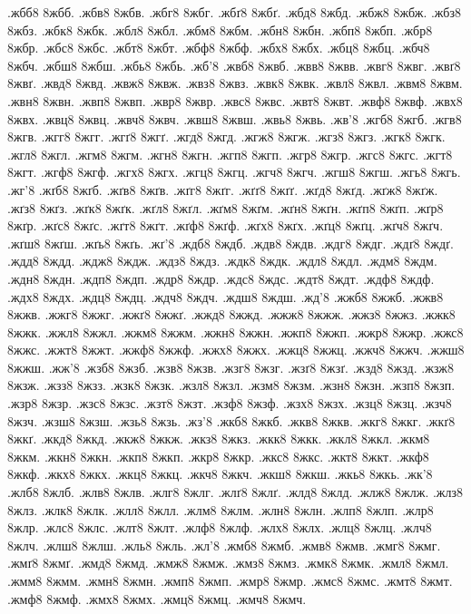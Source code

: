 {%
.жбб8 8жбб.
.жбв8 8жбв.
.жбг8 8жбг.
.жбґ8 8жбґ.
.жбд8 8жбд.
.жбж8 8жбж.
.жбз8 8жбз.
.жбк8 8жбк.
.жбл8 8жбл.
.жбм8 8жбм.
.жбн8 8жбн.
.жбп8 8жбп.
.жбр8 8жбр.
.жбс8 8жбс.
.жбт8 8жбт.
.жбф8 8жбф.
.жбх8 8жбх.
.жбц8 8жбц.
.жбч8 8жбч.
.жбш8 8жбш.
.жбь8 8жбь.
.жб'8
.жвб8 8жвб.
.жвв8 8жвв.
.жвг8 8жвг.
.жвґ8 8жвґ.
.жвд8 8жвд.
.жвж8 8жвж.
.жвз8 8жвз.
.жвк8 8жвк.
.жвл8 8жвл.
.жвм8 8жвм.
.жвн8 8жвн.
.жвп8 8жвп.
.жвр8 8жвр.
.жвс8 8жвс.
.жвт8 8жвт.
.жвф8 8жвф.
.жвх8 8жвх.
.жвц8 8жвц.
.жвч8 8жвч.
.жвш8 8жвш.
.жвь8 8жвь.
.жв'8
.жгб8 8жгб.
.жгв8 8жгв.
.жгг8 8жгг.
.жгґ8 8жгґ.
.жгд8 8жгд.
.жгж8 8жгж.
.жгз8 8жгз.
.жгк8 8жгк.
.жгл8 8жгл.
.жгм8 8жгм.
.жгн8 8жгн.
.жгп8 8жгп.
.жгр8 8жгр.
.жгс8 8жгс.
.жгт8 8жгт.
.жгф8 8жгф.
.жгх8 8жгх.
.жгц8 8жгц.
.жгч8 8жгч.
.жгш8 8жгш.
.жгь8 8жгь.
.жг'8
.жґб8 8жґб.
.жґв8 8жґв.
.жґг8 8жґг.
.жґґ8 8жґґ.
.жґд8 8жґд.
.жґж8 8жґж.
.жґз8 8жґз.
.жґк8 8жґк.
.жґл8 8жґл.
.жґм8 8жґм.
.жґн8 8жґн.
.жґп8 8жґп.
.жґр8 8жґр.
.жґс8 8жґс.
.жґт8 8жґт.
.жґф8 8жґф.
.жґх8 8жґх.
.жґц8 8жґц.
.жґч8 8жґч.
.жґш8 8жґш.
.жґь8 8жґь.
.жґ'8
.ждб8 8ждб.
.ждв8 8ждв.
.ждг8 8ждг.
.ждґ8 8ждґ.
.ждд8 8ждд.
.ждж8 8ждж.
.ждз8 8ждз.
.ждк8 8ждк.
.ждл8 8ждл.
.ждм8 8ждм.
.ждн8 8ждн.
.ждп8 8ждп.
.ждр8 8ждр.
.ждс8 8ждс.
.ждт8 8ждт.
.ждф8 8ждф.
.ждх8 8ждх.
.ждц8 8ждц.
.ждч8 8ждч.
.ждш8 8ждш.
.жд'8
.жжб8 8жжб.
.жжв8 8жжв.
.жжг8 8жжг.
.жжґ8 8жжґ.
.жжд8 8жжд.
.жжж8 8жжж.
.жжз8 8жжз.
.жжк8 8жжк.
.жжл8 8жжл.
.жжм8 8жжм.
.жжн8 8жжн.
.жжп8 8жжп.
.жжр8 8жжр.
.жжс8 8жжс.
.жжт8 8жжт.
.жжф8 8жжф.
.жжх8 8жжх.
.жжц8 8жжц.
.жжч8 8жжч.
.жжш8 8жжш.
.жж'8
.жзб8 8жзб.
.жзв8 8жзв.
.жзг8 8жзг.
.жзґ8 8жзґ.
.жзд8 8жзд.
.жзж8 8жзж.
.жзз8 8жзз.
.жзк8 8жзк.
.жзл8 8жзл.
.жзм8 8жзм.
.жзн8 8жзн.
.жзп8 8жзп.
.жзр8 8жзр.
.жзс8 8жзс.
.жзт8 8жзт.
.жзф8 8жзф.
.жзх8 8жзх.
.жзц8 8жзц.
.жзч8 8жзч.
.жзш8 8жзш.
.жзь8 8жзь.
.жз'8
.жкб8 8жкб.
.жкв8 8жкв.
.жкг8 8жкг.
.жкґ8 8жкґ.
.жкд8 8жкд.
.жкж8 8жкж.
.жкз8 8жкз.
.жкк8 8жкк.
.жкл8 8жкл.
.жкм8 8жкм.
.жкн8 8жкн.
.жкп8 8жкп.
.жкр8 8жкр.
.жкс8 8жкс.
.жкт8 8жкт.
.жкф8 8жкф.
.жкх8 8жкх.
.жкц8 8жкц.
.жкч8 8жкч.
.жкш8 8жкш.
.жкь8 8жкь.
.жк'8
.жлб8 8жлб.
.жлв8 8жлв.
.жлг8 8жлг.
.жлґ8 8жлґ.
.жлд8 8жлд.
.жлж8 8жлж.
.жлз8 8жлз.
.жлк8 8жлк.
.жлл8 8жлл.
.жлм8 8жлм.
.жлн8 8жлн.
.жлп8 8жлп.
.жлр8 8жлр.
.жлс8 8жлс.
.жлт8 8жлт.
.жлф8 8жлф.
.жлх8 8жлх.
.жлц8 8жлц.
.жлч8 8жлч.
.жлш8 8жлш.
.жль8 8жль.
.жл'8
.жмб8 8жмб.
.жмв8 8жмв.
.жмг8 8жмг.
.жмґ8 8жмґ.
.жмд8 8жмд.
.жмж8 8жмж.
.жмз8 8жмз.
.жмк8 8жмк.
.жмл8 8жмл.
.жмм8 8жмм.
.жмн8 8жмн.
.жмп8 8жмп.
.жмр8 8жмр.
.жмс8 8жмс.
.жмт8 8жмт.
.жмф8 8жмф.
.жмх8 8жмх.
.жмц8 8жмц.
.жмч8 8жмч.
}
